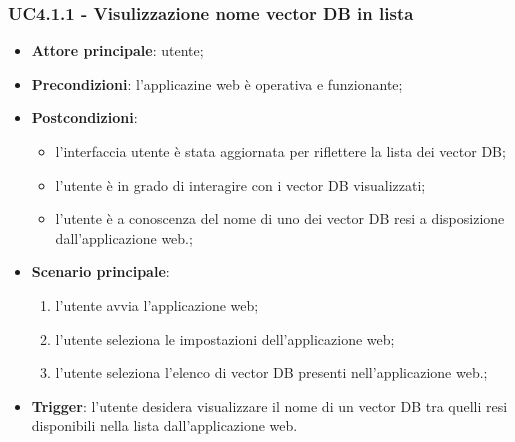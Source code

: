 \documentclass[10pt, a4paper]{article}
\begin{document}
    \subsubsection{UC4.1.1 - Visulizzazione nome vector DB in lista}
    \begin{itemize}
        \item \textbf{Attore principale}: utente;
        \item \textbf{Precondizioni}: l'applicazine web è operativa e funzionante;
        \item \textbf{Postcondizioni}: 
        \begin{itemize}
            \item l'interfaccia utente è stata aggiornata per riflettere la lista dei vector DB;
            \item l'utente è in grado di interagire con i vector DB visualizzati;
            \item l'utente è a conoscenza del nome di uno dei vector DB resi a disposizione dall'applicazione web.;
        \end{itemize}  
        \item \textbf{Scenario principale}:
            \begin{enumerate}
                \item l'utente avvia l'applicazione web;
                \item l'utente seleziona le impostazioni dell'applicazione web;
                \item l'utente seleziona l'elenco di vector DB presenti nell'applicazione web.;
            \end{enumerate}
        \item \textbf{Trigger}: l'utente desidera visualizzare il nome di un vector DB tra quelli resi disponibili nella lista dall'applicazione web.
    \end{itemize}
\end{document}
